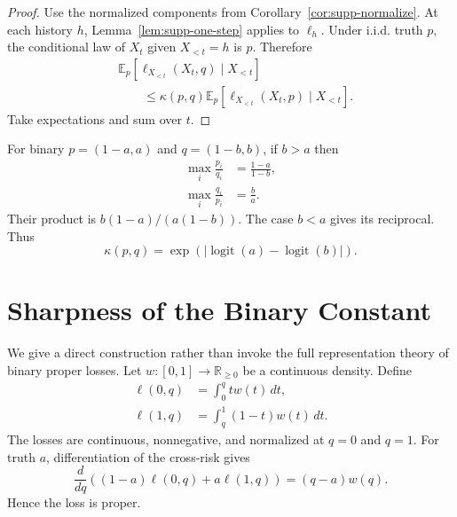\documentclass[twoside]{article}
\newcommand{\E}{\mathbb E}
\newcommand{\1}{\mathbf 1}
\begin{document}
\begin{proof}
Use the normalized components from Corollary~\ref{cor:supp-normalize}. At
each history $h$, Lemma~\ref{lem:supp-one-step} applies to $\ell_h$. Under
i.i.d. truth $p$, the conditional law of $X_t$ given $X_{<t}=h$ is $p$.
Therefore
\begin{align*}
 &\E_p[\ell_{X_{<t}}(X_t,q)\mid X_{<t}]\\
 &\qquad\leq\kappa(p,q)
 \E_p[\ell_{X_{<t}}(X_t,p)\mid X_{<t}].
\end{align*}
Take expectations and sum over $t$.
\end{proof}

For binary $p=(1-a,a)$ and $q=(1-b,b)$, if $b>a$ then
\begin{align*}
 \max_i\frac{p_i}{q_i}&=\frac{1-a}{1-b},\\
 \max_i\frac{q_i}{p_i}&=\frac{b}{a}.
\end{align*}
Their product is $b(1-a)/(a(1-b))$. The case $b<a$ gives its reciprocal.
Thus
\begin{equation}
 \kappa(p,q)=
 \exp\!\left(|\operatorname{logit}(a)-\operatorname{logit}(b)|\right).
 \label{eq:supp-binary-kappa}
\end{equation}

\section{Sharpness of the Binary Constant}
\label{app:sharpness}

We give a direct construction rather than invoke the full representation
theory of binary proper losses. Let $w:[0,1]\to\mathbb R_{\geq0}$ be a
continuous density. Define
\begin{align}
 \ell(0,q)&=\int_0^q t w(t)\,dt,\label{eq:supp-binary-loss0}\\
 \ell(1,q)&=\int_q^1 (1-t)w(t)\,dt.
 \label{eq:supp-binary-loss1}
\end{align}
The losses are continuous, nonnegative, and normalized at $q=0$ and $q=1$.
For truth $a$, differentiation of the cross-risk gives
\begin{equation*}
 \frac{d}{dq}\left((1-a)\ell(0,q)+a\ell(1,q)\right)
 =(q-a)w(q).
\end{equation*}
Hence the loss is proper.
\end{document}
